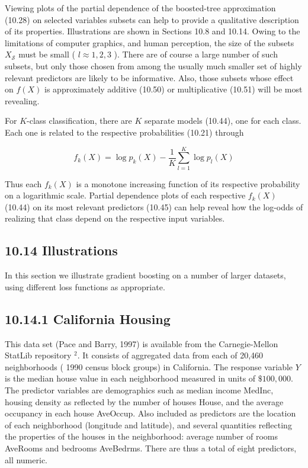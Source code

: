 \documentclass[10pt]{article}
\begin{document}
Viewing plots of the partial dependence of the boosted-tree approximation (10.28) on selected variables subsets can help to provide a qualitative description of its properties. Illustrations are shown in Sections 10.8 and 10.14. Owing to the limitations of computer graphics, and human perception, the size of the subsets $X_{\mathcal{S}}$ must be small ( $l \approx 1,2,3$ ). There are of course a large number of such subsets, but only those chosen from among the usually much smaller set of highly relevant predictors are likely to be informative. Also, those subsets whose effect on $f(X)$ is approximately additive (10.50) or multiplicative (10.51) will be most revealing.

For $K$-class classification, there are $K$ separate models (10.44), one for each class. Each one is related to the respective probabilities (10.21) through


\begin{equation*}
f_{k}(X)=\log p_{k}(X)-\frac{1}{K} \sum_{l=1}^{K} \log p_{l}(X) \tag{10.52}
\end{equation*}


Thus each $f_{k}(X)$ is a monotone increasing function of its respective probability on a logarithmic scale. Partial dependence plots of each respective $f_{k}(X)$ (10.44) on its most relevant predictors (10.45) can help reveal how the log-odds of realizing that class depend on the respective input variables.

\subsection*{10.14 Illustrations}
In this section we illustrate gradient boosting on a number of larger datasets, using different loss functions as appropriate.

\subsection*{10.14.1 California Housing}
This data set (Pace and Barry, 1997) is available from the Carnegie-Mellon StatLib repository ${ }^{2}$. It consists of aggregated data from each of 20,460 neighborhoods ( 1990 census block groups) in California. The response variable $Y$ is the median house value in each neighborhood measured in units of $\$ 100,000$. The predictor variables are demographics such as median income MedInc, housing density as reflected by the number of houses House, and the average occupancy in each house AveOccup. Also included as predictors are the location of each neighborhood (longitude and latitude), and several quantities reflecting the properties of the houses in the neighborhood: average number of rooms AveRooms and bedrooms AveBedrms. There are thus a total of eight predictors, all numeric.
\end{document}
